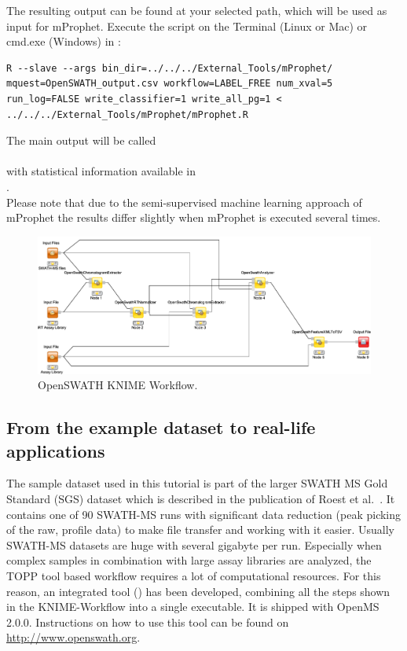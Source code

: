 The resulting output can be found at your selected path, which will be used as input for mProphet. Execute the script on the Terminal (Linux or Mac) or cmd.exe (Windows) in :

\begin{lstlisting}
R --slave --args bin_dir=../../../External_Tools/mProphet/ mquest=OpenSWATH_output.csv workflow=LABEL_FREE num_xval=5 run_log=FALSE write_classifier=1 write_all_pg=1 < ../../../External_Tools/mProphet/mProphet.R
\end{lstlisting}

The main output will be called\\
\\
with statistical information available in\\
.\\

Please note that due to the semi-supervised machine learning approach of mProphet the results differ slightly when mProphet is executed several times.

\begin{figure}[htbp]
  \includegraphics[width=1\textwidth]{graphics/OpenSwath}
\caption{OpenSWATH KNIME Workflow.}
\label{fig:toppas}
\end{figure}

\subsection{From the example dataset to real-life applications}
The sample dataset used in this tutorial is part of the larger SWATH MS Gold Standard (SGS) dataset which is described in the publication of Roest et al.~\cite{Rost2014fd}.
It contains one of 90 SWATH-MS runs with significant data reduction (peak picking of the raw, profile data) to make file transfer and working with it easier. Usually SWATH-MS datasets are huge with several gigabyte per run. Especially when complex samples in combination with large assay libraries are analyzed, the TOPP tool based workflow requires a lot of computational resources. For this reason, an integrated tool () has been developed, combining all the steps shown in the KNIME-Workflow into a single executable. It is shipped with OpenMS 2.0.0. Instructions on how to use this tool can be found on \url{http://www.openswath.org}.

